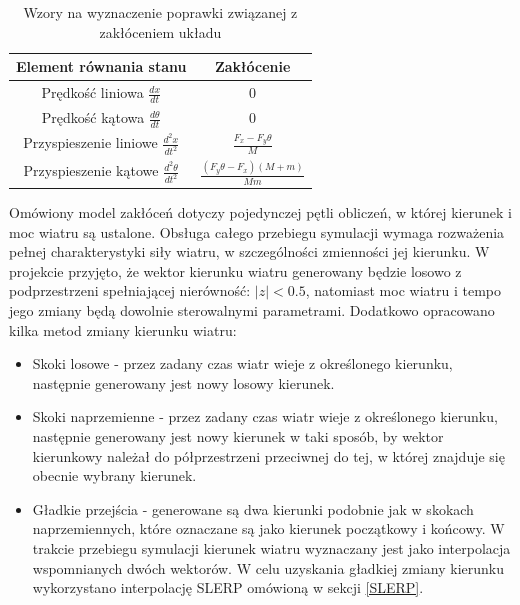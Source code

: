 \documentclass[12pt, twoside, openany]{report}
\theoremstyle{definition}
\begin{document}
\begin{table}[H]
\begin{center}
\begin{tabular}{|c|c|}
  \hline 
  Element równania stanu & Zakłócenie \\
  \hline
  Prędkość liniowa $\frac{dx}{dt}$ & 0 \\
  \hline
  Prędkość kątowa $\frac{d\theta}{dt}$ & 0 \\
  \hline
  Przyspieszenie liniowe $\frac{d^2x}{dt^2}$ & $\frac{F_x - F_y\theta}{M}$ \\
  \hline
  Przyspieszenie kątowe $\frac{d^2\theta}{dt^2}$ & $\frac{(F_y\theta - F_x)(M + m)}{Mm}$ \\
  \hline
\end{tabular} 
\end{center}
\caption{Wzory na wyznaczenie poprawki związanej z zakłóceniem układu}
\label{table:Noises}
\end{table}

Omówiony model zakłóceń dotyczy pojedynczej pętli obliczeń, w której kierunek i moc wiatru są ustalone. Obsługa całego przebiegu symulacji wymaga rozważenia pełnej charakterystyki siły wiatru, w szczególności zmienności jej kierunku. W projekcie przyjęto, że wektor kierunku wiatru generowany będzie losowo z podprzestrzeni spełniającej nierówność: $|z| < 0.5$, natomiast moc wiatru i tempo jego zmiany będą dowolnie sterowalnymi parametrami. Dodatkowo opracowano kilka metod zmiany kierunku wiatru:
\begin{itemize}
\item Skoki losowe - przez zadany czas wiatr wieje z określonego kierunku, następnie generowany jest nowy losowy kierunek.
\item Skoki naprzemienne - przez zadany czas wiatr wieje z określonego kierunku, następnie generowany jest nowy kierunek w taki sposób, by wektor kierunkowy należał do półprzestrzeni przeciwnej do tej, w której znajduje się obecnie wybrany kierunek.
\item Gładkie przejścia - generowane są dwa kierunki podobnie jak w skokach naprzemiennych, które oznaczane są jako kierunek początkowy i końcowy. W trakcie przebiegu symulacji kierunek wiatru wyznaczany jest jako interpolacja wspomnianych dwóch wektorów. W celu uzyskania gładkiej zmiany kierunku wykorzystano interpolację SLERP omówioną w sekcji \ref{SLERP}. 
\end{itemize}
\end{document}
